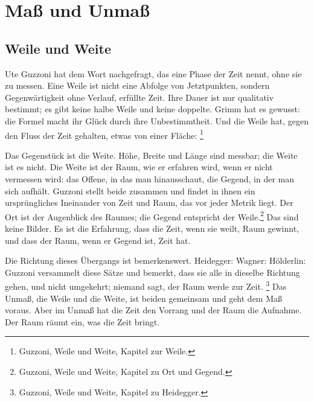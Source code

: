\chapter{Maß und Unmaß}

\section{Weile und Weite}

Ute Guzzoni hat dem Wort  nachgefragt, das eine Phase der Zeit nennt, ohne sie zu messen. Eine Weile ist nicht eine Abfolge von Jetztpunkten, sondern Gegenwärtigkeit ohne Verlauf, erfüllte Zeit. Ihre Dauer ist nur qualitativ bestimmt; es gibt keine halbe Weile und keine doppelte. Grimm hat es gewusst: die Formel  macht ihr Glück durch ihre Unbestimmtheit. Und die Weile hat, gegen den Fluss der Zeit gehalten, etwas von einer Fläche: \footnote{Guzzoni, Weile und Weite, Kapitel zur Weile.}

Das Gegenstück ist die Weite. Höhe, Breite und Länge sind messbar; die Weite ist es nicht. Die Weite ist der Raum, wie er erfahren wird, wenn er nicht vermessen wird: das Offene, in das man hinausschaut, die Gegend, in der man sich aufhält. Guzzoni stellt beide zusammen und findet in ihnen ein ursprüngliches Ineinander von Zeit und Raum, das vor jeder Metrik liegt. Der Ort ist der Augenblick des Raumes; die Gegend entspricht der Weile.\footnote{Guzzoni, Weile und Weite, Kapitel zu Ort und Gegend.} Das sind keine Bilder. Es ist die Erfahrung, dass die Zeit, wenn sie weilt, Raum gewinnt, und dass der Raum, wenn er Gegend ist, Zeit hat.

Die Richtung dieses Übergangs ist bemerkenswert. Heidegger:  Wagner:  Hölderlin:  Guzzoni versammelt diese Sätze und bemerkt, dass sie alle in dieselbe Richtung gehen, und nicht umgekehrt; niemand sagt, der Raum werde zur Zeit. \footnote{Guzzoni, Weile und Weite, Kapitel zu Heidegger.} Das Unmaß, die Weile und die Weite, ist beiden gemeinsam und geht dem Maß voraus. Aber im Unmaß hat die Zeit den Vorrang und der Raum die Aufnahme. Der Raum räumt ein, was die Zeit bringt.

